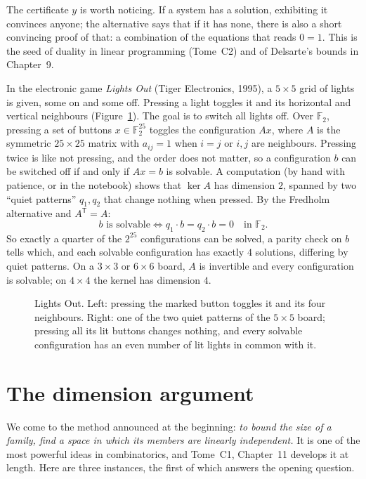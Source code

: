 The certificate $y$ is worth noticing. If a system has a solution, exhibiting it convinces anyone; the alternative says
that if it has none, there is also a short convincing proof of that: a combination of the equations that reads $0=1$.
This is the seed of duality in linear programming (Tome~C2) and of Delsarte's bounds in Chapter~9.

\begin{example}\label{ex:lightsout}
In the electronic game \emph{Lights Out} (Tiger Electronics, 1995), a $5\times5$ grid of lights is given, some on and
some off. Pressing a light toggles it and its horizontal and vertical neighbours (Figure~\ref{fig:lightsout}). The goal
is to switch all lights off. Over $\mathbb F_2$, pressing a set of buttons $x\in\mathbb F_2^{25}$ toggles the
configuration $Ax$, where $A$ is the symmetric $25\times25$ matrix with $a_{ij}=1$ when $i=j$ or $i,j$ are neighbours.
Pressing twice is like not pressing, and the order does not matter, so a configuration $b$ can be switched off if and only
if $Ax=b$ is solvable. A computation (by hand with patience, or in the notebook) shows that $\ker A$ has dimension $2$,
spanned by two ``quiet patterns'' $q_1,q_2$ that change nothing when pressed. By the Fredholm alternative and
$A^{\mathsf T}=A$:
\[
b\text{ is solvable}\iff q_1\cdot b=q_2\cdot b=0\quad\text{in }\mathbb F_2 .
\]
So exactly a quarter of the $2^{25}$ configurations can be solved, a parity check on $b$ tells which, and each solvable
configuration has exactly $4$ solutions, differing by quiet patterns. On a $3\times3$ or $6\times6$ board, $A$ is
invertible and every configuration is solvable; on $4\times4$ the kernel has dimension $4$.
\end{example}

\begin{figure}[ht]
\centering
{}
\caption{Lights Out. Left: pressing the marked button toggles it and its four neighbours. Right: one of the two quiet
patterns of the $5\times5$ board; pressing all its lit buttons changes nothing, and every solvable configuration has an
even number of lit lights in common with it.}
\label{fig:lightsout}
\end{figure}

\section{The dimension argument}\label{sec:dimarg}

We come to the method announced at the beginning: \emph{to bound the size of a family, find a space in which its
members are linearly independent.} It is one of the most powerful ideas in combinatorics, and Tome~C1, Chapter~11
develops it at length. Here are three instances, the first of which answers the opening question.

